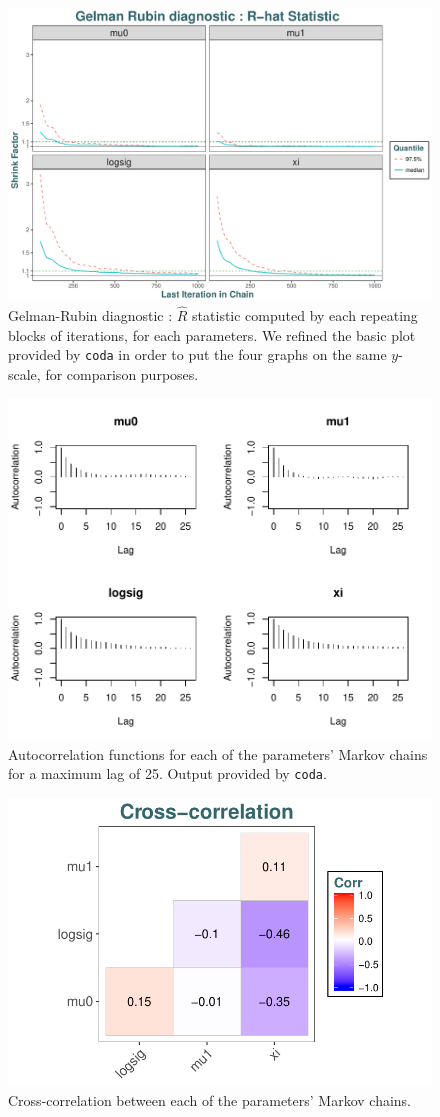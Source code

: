 \begin{figure}[!htb]
	\centering	\includegraphics[width=0.7\linewidth]{gelmdiag.pdf}\caption{Gelman-Rubin diagnostic : $\hat{R}$ statistic computed by each repeating blocks of iterations, for each parameters. We refined the basic plot provided by \texttt{coda} in order to put the four graphs on the same $y$-scale, for comparison purposes.}\label{fig:gelmdiag}
\end{figure}


\begin{figure}[!htb]
	\centering	\includegraphics[width=0.8\linewidth]{autocor.pdf}\caption{Autocorrelation functions for each of the parameters' Markov chains for a maximum lag of 25. Output provided by \texttt{coda}. }\label{fig:autocor}
\end{figure}

\begin{figure}[!htb]
	\centering	\includegraphics[width=0.5\linewidth]{crosscorr.pdf}\caption{Cross-correlation between each of the parameters' Markov chains.}\label{fig:crosscorr}
\end{figure}


